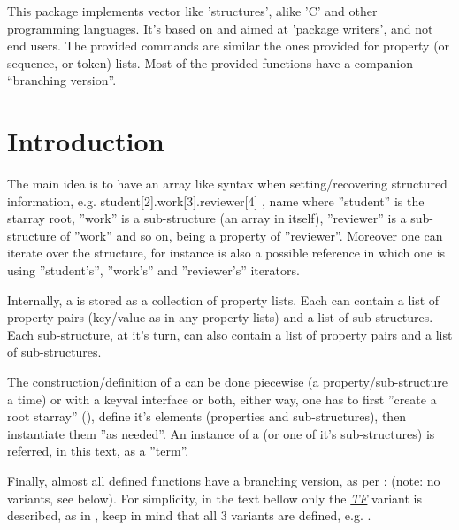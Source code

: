 \documentclass[10pt]{article}
\begin{document}
  
\begin{typesetabstract}

This package implements vector like 'structures', alike 'C' and other programming languages. 
It's based on  and aimed at 'package writers', and not end users. The provided commands are similar the ones provided for property (or sequence, or token) lists. Most of the provided functions have a companion ``branching version''.

\end{typesetabstract}

\tableofcontents

\section{Introduction}
The main idea is to have an array like syntax when setting/recovering structured information, e.g.  {student[2].work[3].reviewer[4] , name} where ''student'' is the starray root, ''work'' is a sub-structure (an array in itself), ''reviewer'' is a sub-structure of ''work'' and so on,  being a property of ''reviewer''. Moreover one can iterate over the structure, for instance  is also a possible reference in which one is using ''student's'', ''work's'' and ''reviewer's'' iterators.

Internally, a  is stored as a collection of property lists. Each  can contain a list of property pairs (key/value as in any  property lists) and a list of sub-structures. Each sub-structure, at it's turn, can also contain a list of property pairs and a list of sub-structures. 

The construction/definition of a  can be done piecewise (a property/sub-structure a time) or with a keyval interface or both, either way, one has to first ''create a root starray'' (), define it's elements (properties and sub-structures), then instantiate them ''as needed''. An instance of a  (or one of it's sub-structures) is referred, in this text, as a ''term''.

Finally, almost all defined functions have a branching version, as per :  (note: no  variants, see below). For simplicity, in the text bellow only the \underline{\textsl{TF}} variant is described, as in , keep in mind that all 3 variants are defined, e.g. .
\end{document}
